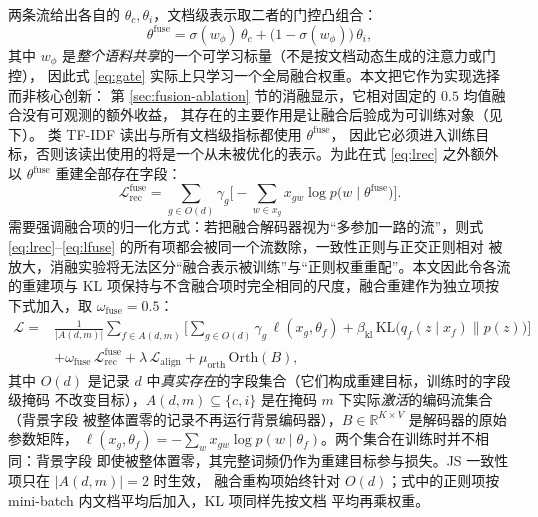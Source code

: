 \documentclass[11pt]{ctexart}
\begin{document}
两条流给出各自的 $\theta_c,\theta_i$，文档级表示取二者的门控凸组合：
\begin{equation}
\theta^{\mathrm{fuse}}=\sigma(w_\phi)\,\theta_c
+\big(1-\sigma(w_\phi)\big)\,\theta_i ,
\label{eq:gate}
\end{equation}
其中 $w_\phi$ 是\emph{整个语料共享}的一个可学习标量（不是按文档动态生成的注意力或门控），
因此式 \eqref{eq:gate} 实际上只学习一个全局融合权重。本文把它作为实现选择而非核心创新：
第 \ref{sec:fusion-ablation} 节的消融显示，它相对固定的 $0.5$ 均值融合没有可观测的额外收益，
其存在的主要作用是让融合后验成为可训练对象（见下）。
类 TF-IDF 读出与所有文档级指标都使用 $\theta^{\mathrm{fuse}}$，
因此它必须进入训练目标，否则该读出使用的将是一个从未被优化的表示。为此在式
\eqref{eq:lrec} 之外额外以 $\theta^{\mathrm{fuse}}$ 重建全部存在字段：
\begin{equation}
\mathcal{L}_{\mathrm{rec}}^{\mathrm{fuse}}
=\sum_{g\in O(d)}\gamma_g\Big[-\sum_{w\in x_g}x_{gw}\log p\big(w\mid\theta^{\mathrm{fuse}}\big)\Big].
\label{eq:lfuse}
\end{equation}
需要强调融合项的归一化方式：若把融合解码器视为“多参加一路的流”，则式
\eqref{eq:lrec}--\eqref{eq:lfuse} 的所有项都会被同一个流数除，一致性正则与正交正则相对
被放大，消融实验将无法区分“融合表示被训练”与“正则权重重配”。本文因此令各流的重建项与
KL 项保持与不含融合项时完全相同的尺度，融合重建作为独立项按下式加入，取
$\omega_{\mathrm{fuse}}=0.5$：
\begin{equation}
\begin{aligned}
\mathcal{L}={}&\frac{1}{|A(d,m)|}\sum_{f\in A(d,m)}
\Big[\sum_{g\in O(d)}\gamma_g\,\ell(x_g,\theta_f)
+\beta_{\mathrm{kl}}\,\mathrm{KL}\big(q_f(z\mid x_f)\parallel p(z)\big)\Big]\\
&+\omega_{\mathrm{fuse}}\,\mathcal{L}_{\mathrm{rec}}^{\mathrm{fuse}}
+\lambda\,\mathcal{L}_{\mathrm{align}}
+\mu_{\mathrm{orth}}\,\mathrm{Orth}(B),
\end{aligned}
\label{eq:total}
\end{equation}
其中 $O(d)$ 是记录 $d$ 中\emph{真实存在}的字段集合（它们构成重建目标，训练时的字段级掩码
不改变目标），$A(d,m)\subseteq\{c,i\}$ 是在掩码 $m$ 下实际\emph{激活}的编码流集合（背景字段
被整体置零的记录不再运行背景编码器），$B\in\mathbb{R}^{K\times V}$ 是解码器的原始参数矩阵，
$\ell(x_g,\theta_f)=-\sum_{w}x_{gw}\log p(w\mid\theta_f)$。两个集合在训练时并不相同：背景字段
即使被整体置零，其完整词频仍作为重建目标参与损失。JS 一致性项只在 $|A(d,m)|=2$ 时生效，
融合重构项始终针对 $O(d)$；式中的正则项按 mini-batch 内文档平均后加入，KL 项同样先按文档
平均再乘权重。
\end{document}
